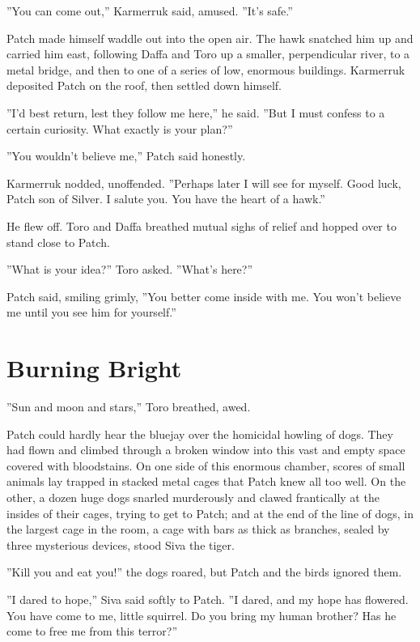 \documentclass[12pt]{book}
\begin{document}
''You can come out,'' Karmerruk said, amused. ''It's safe.''

Patch made himself waddle out into the open air. The hawk snatched him
up and carried him east, following Daffa and Toro up a smaller,
perpendicular river, to a metal bridge, and then to one of a series of
low, enormous buildings. Karmerruk deposited Patch on the roof, then
settled down himself.

''I'd best return, lest they follow me here,'' he said. ''But I must
confess to a certain curiosity. What exactly is your plan?''

''You wouldn't believe me,'' Patch said honestly.

Karmerruk nodded, unoffended. ''Perhaps later I will see for
myself. Good luck, Patch son of Silver. I salute you. You have the
heart of a hawk.''

He flew off. Toro and Daffa breathed mutual sighs of relief and hopped
over to stand close to Patch.

''What is your idea?'' Toro asked. ''What's here?''

Patch said, smiling grimly, ''You better come inside with me. You
won't believe me until you see him for yourself.''


\section{Burning Bright}

''Sun and moon and stars,'' Toro breathed, awed.

Patch could hardly hear the bluejay over the homicidal howling of
dogs. They had flown and climbed through a broken window into this
vast and empty space covered with bloodstains. On one side of this
enormous chamber, scores of small animals lay trapped in stacked metal
cages that Patch knew all too well. On the other, a dozen huge dogs
snarled murderously and clawed frantically at the insides of their
cages, trying to get to Patch; and at the end of the line of dogs, in
the largest cage in the room, a cage with bars as thick as branches,
sealed by three mysterious devices, stood Siva the tiger.

''Kill you and eat you!'' the dogs roared, but Patch and the birds
ignored them.

''I dared to hope,'' Siva said softly to Patch. ''I dared, and my hope
has flowered. You have come to me, little squirrel. Do you bring my
human brother? Has he come to free me from this terror?''
\end{document}
